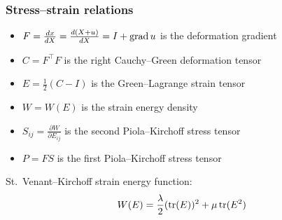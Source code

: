 \begin{frame}
  \frametitle{Stress--strain relations}

  \begin{itemize}
  \item
    $F = \frac{dx}{dX} = \frac{d(X+u)}{dX} = I + \operatorname{\mathrm{grad}} u$ is the deformation gradient
  \item
    $C = F^{\top} F$ is the right Cauchy--Green deformation tensor
  \item
    $E = \frac{1}{2}(C - I)$ is the Green--Lagrange strain tensor
  \item
    $W = W(E)$ is the strain energy density
  \item
    $S_{ij} = \frac{\partial W}{\partial E_{ij}}$ is the second
    Piola--Kirchoff stress tensor
  \item
    $P = FS$ is the first Piola--Kirchoff stress tensor
  \end{itemize}

  St.~Venant--Kirchoff strain energy function:
  \begin{equation*}
    W(E) = \frac{\lambda}{2} (\operatorname{\mathrm{tr}}(E))^2 + \mu\operatorname{\mathrm{tr}}(E^2)
  \end{equation*}

\end{frame}
